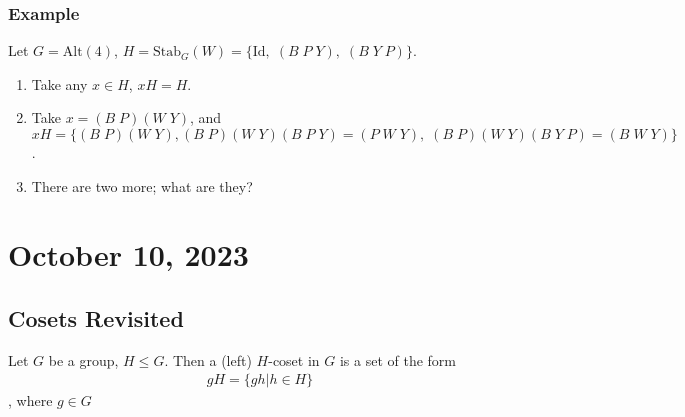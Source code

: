 \documentclass[11pt]{article}
\newcommand{\0}{\emptyset}
\begin{document}
\subsubsection*{Example}
\label{sec:org8734289}
Let \(G=\text{Alt}(4)\), \(H=\text{Stab}_{G}(W)=\{\text{Id},\;(B\;P\;Y),\;(B\;Y\;P)\}\).\\[0pt]
\begin{enumerate}
\item Take any \(x\in H\), \(xH=H\).\\[0pt]
\item Take \(x=(B\;P)(W\;Y)\), and \(xH=\{(B\;P)(W\;Y),(B\;P)(W\;Y)(B\;P\;Y)=(P\;W\;Y),\;(B\;P)(W\;Y)(B\;Y\;P)=(B\;W\;Y)\}\).\\[0pt]
\item There are two more; what are they?\\[0pt]
\end{enumerate}
\section*{October 10, 2023}
\label{sec:org9c7a684}
\subsection*{Cosets Revisited}
\label{sec:orgc60b80e}
Let \(G\) be a group, \(H\leq G\). Then a (left) \(H\)-coset in \(G\) is a set of the form\\[0pt]
\begin{align*}
    gH = \{gh|h\in H\}
\end{align*}
, where \(g\in G\)\\[0pt]
\end{document}
